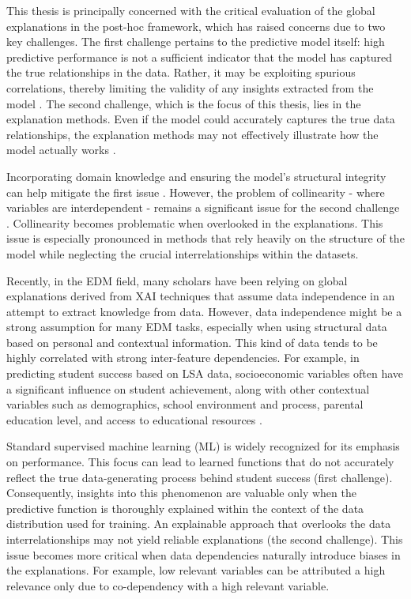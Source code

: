 This thesis is principally concerned with the critical evaluation of the global explanations in the post-hoc framework, which has raised concerns due to two key challenges. The first challenge pertains to the predictive model itself: high predictive performance is not a sufficient indicator that the model has captured the true relationships in the data. Rather, it may be exploiting spurious correlations, thereby limiting the validity of any insights extracted from the model \cite{Mittelstadt2019ExplainingAI}. The second challenge, which is the focus of this thesis, lies in the explanation methods. Even if the model could accurately captures the true data relationships, the explanation methods may not effectively illustrate how the model actually works \cite{Rudin2019StopInstead, Mittelstadt2019ExplainingAI}.

Incorporating domain knowledge and ensuring the model's structural integrity can help mitigate the first issue \cite{Frye2021ShapleyManifold, Zhao2021CausalModels}. However, the problem of collinearity - where variables are interdependent - remains a significant issue for the second challenge \cite{Hooker2019UnrestrictedImportance}. Collinearity becomes problematic when overlooked in the explanations. This issue is especially pronounced in methods that rely heavily on the structure of the model while neglecting the crucial interrelationships within the datasets.

Recently, in the EDM field, many scholars have been relying on global explanations derived from XAI  techniques that assume data independence in an attempt to extract knowledge from data. However, data independence might be a strong assumption for many EDM tasks, especially when using structural data based on personal and contextual information. This kind of data tends to be highly correlated with strong inter-feature dependencies. For example, in predicting student success based on LSA data, socioeconomic variables often have a significant influence on student achievement, along with other contextual variables such as demographics, school environment and process, parental education level, and access to educational resources \cite{coleman1968equality, Andrade2008OBrasileira}. 

Standard supervised machine learning (ML) is widely recognized for its emphasis on performance. This focus can lead to learned functions that do not accurately reflect the true data-generating process behind student success (first challenge). Consequently, insights into this phenomenon are valuable only when the predictive function is thoroughly explained within the context of the data distribution used for training. An explainable approach that overlooks the data interrelationships may not yield reliable explanations (the second challenge).  This issue becomes more critical when data dependencies naturally introduce biases in the explanations. For example, low relevant variables can be attributed a high relevance only due to co-dependency with a high relevant variable. 


